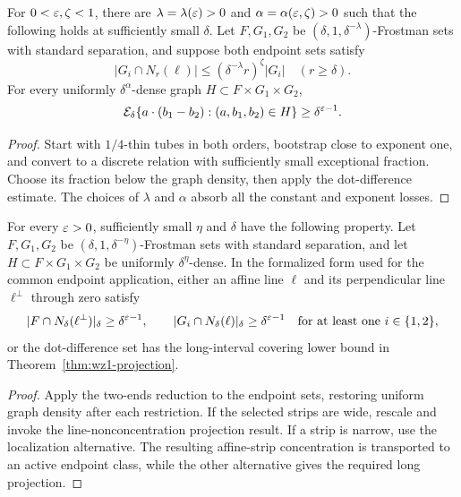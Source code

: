 \begin{proposition}
\label{prop:line-nonconcentration}
For $0<\varepsilon,\zeta<1$, there are $\lambda=\lambda(\varepsilon)>0$
and $\alpha=\alpha(\varepsilon,\zeta)>0$ such that the following holds
at sufficiently small $\delta$. Let $F,G_1,G_2$ be
$(\delta,1,\delta^{-\lambda})$-Frostman sets with standard
separation, and suppose both endpoint sets satisfy
\[
              |G_i\cap N_r(\ell)|
                    \leq(\delta^{-\lambda}r)^\zeta|G_i|
                    \quad(r\geq\delta).
\]
For every uniformly $\delta^\alpha$-dense graph
$H\subset F\times G_1\times G_2$,
\[
       \mathcal{E}_\delta\{a\cdot(b_1-b_2):(a,b_1,b_2)\in H\}
                                             \geq\delta^{\varepsilon-1}.
\]
\end{proposition}
\begin{proof}
Start with $1/4$-thin tubes in both orders, bootstrap close to
exponent one, and convert to a discrete relation with sufficiently
small exceptional fraction. Choose its fraction below the graph
density, then apply the dot-difference estimate. The choices of
$\lambda$ and $\alpha$ absorb all the constant and exponent losses.
\end{proof}

\begin{proposition}
\label{prop:wz1-separated}
\leanok
{}
For every $\varepsilon>0$, sufficiently small $\eta$ and $\delta$ have
the following property. Let $F,G_1,G_2$ be
$(\delta,1,\delta^{-\eta})$-Frostman sets with standard
separation, and let $H\subset F\times G_1\times G_2$ be uniformly
$\delta^\eta$-dense. In the formalized form used for the common
endpoint application, either an affine line $\ell$ and its
perpendicular line $\ell^\perp$ through zero satisfy
\[
 |F\cap N_\delta(\ell^\perp)|_\delta\geq\delta^{\varepsilon-1},
 \qquad
 |G_i\cap N_\delta(\ell)|_\delta\geq\delta^{\varepsilon-1}
 \quad\text{for at least one }i\in\{1,2\},
\]
or the dot-difference set has the long-interval covering lower
bound in Theorem~\ref{thm:wz1-projection}.
\end{proposition}
\begin{proof}
\leanok
Apply the two-ends reduction to the endpoint sets, restoring uniform
graph density after each restriction. If the selected strips are
wide, rescale and invoke the line-nonconcentration projection result.
If a strip is narrow, use the localization alternative. The resulting
affine-strip concentration is transported to an active endpoint
class, while the other alternative gives the required long projection.
\end{proof}

